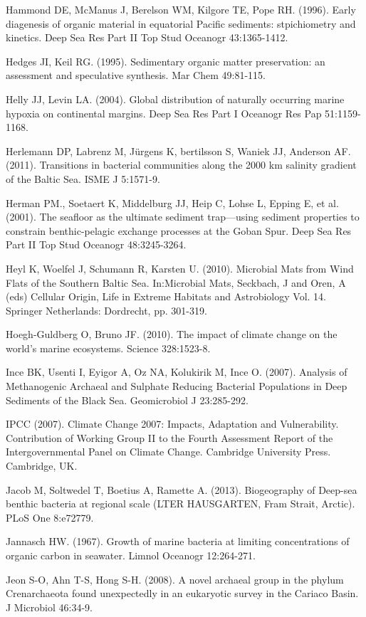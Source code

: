 Hammond DE, McManus J, Berelson WM, Kilgore TE, Pope RH. (1996). Early diagenesis of organic material in equatorial Pacific sediments: stpichiometry and kinetics. Deep Sea Res Part II Top Stud Oceanogr 43:1365-1412.

Hedges JI, Keil RG. (1995). Sedimentary organic matter preservation: an assessment and speculative synthesis. Mar Chem 49:81-115.

Helly JJ, Levin LA. (2004). Global distribution of naturally occurring marine hypoxia on continental margins. Deep Sea Res Part I Oceanogr Res Pap 51:1159-1168.

Herlemann DP, Labrenz M, J\"urgens K, bertilsson S, Waniek JJ, Anderson AF. (2011). Transitions in bacterial communities along the 2000 km salinity gradient of the Baltic Sea. ISME J 5:1571-9.

Herman PM., Soetaert K, Middelburg JJ, Heip C, Lohse L, Epping E, et al. (2001). The seafloor as the ultimate sediment trap—using sediment properties to constrain benthic-pelagic exchange processes at the Goban Spur. Deep Sea Res Part II Top Stud Oceanogr 48:3245-3264.

Heyl K, Woelfel J, Schumann R, Karsten U. (2010). Microbial Mats from Wind Flats of the Southern Baltic Sea. In:Microbial Mats, Seckbach, J and Oren, A (eds) Cellular Origin, Life in Extreme Habitats and Astrobiology Vol. 14. Springer Netherlands: Dordrecht, pp. 301-319.

Hoegh-Guldberg O, Bruno JF. (2010). The impact of climate change on the world’s marine ecosystems. Science 328:1523-8.

Ince BK, Usenti I, Eyigor A, Oz NA, Kolukirik M, Ince O. (2007). Analysis of Methanogenic Archaeal and Sulphate Reducing Bacterial Populations in Deep Sediments of the Black Sea. Geomicrobiol J 23:285-292.

IPCC (2007). Climate Change 2007: Impacts, Adaptation and Vulnerability. Contribution of Working Group II to the Fourth Assessment Report of the Intergovernmental Panel on Climate Change. Cambridge University Press. Cambridge, UK.

Jacob M, Soltwedel T, Boetius A, Ramette A. (2013). Biogeography of Deep-sea benthic bacteria at regional scale (LTER HAUSGARTEN, Fram Strait, Arctic). PLoS One 8:e72779.

Jannasch HW. (1967). Growth of marine bacteria at limiting concentrations of organic carbon in seawater. Limnol Oceanogr 12:264-271.

Jeon S-O, Ahn T-S, Hong S-H. (2008). A novel archaeal group in the phylum Crenarchaeota found unexpectedly in an eukaryotic survey in the Cariaco Basin. J Microbiol 46:34-9.

